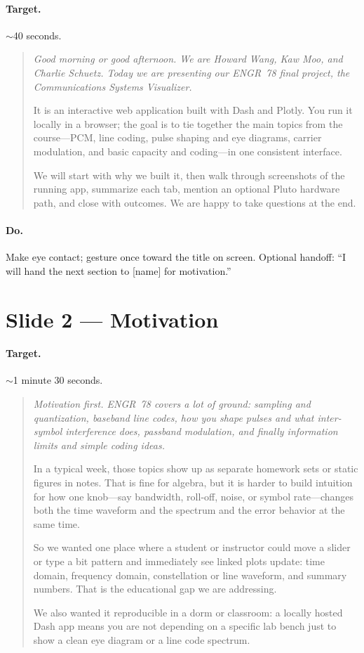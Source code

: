 \documentclass[11pt,a4paper]{article}
\newcommand{\speak}[1]{%
  \begin{quote}\itshape #1\end{quote}%
}
\newcommand{\doitem}[1]{\paragraph{Do.} #1\par\vspace{0.6em}}
\begin{document}
\paragraph{Target.} $\sim$40 seconds.

\speak{%
Good morning or good afternoon. We are Howard Wang, Kaw Moo, and Charlie Schuetz. Today we are presenting our ENGR~78 final project, the Communications Systems Visualizer.

It is an interactive web application built with Dash and Plotly. You run it locally in a browser; the goal is to tie together the main topics from the course---PCM, line coding, pulse shaping and eye diagrams, carrier modulation, and basic capacity and coding---in one consistent interface.

We will start with why we built it, then walk through screenshots of the running app, summarize each tab, mention an optional Pluto hardware path, and close with outcomes. We are happy to take questions at the end.%
}

\doitem{Make eye contact; gesture once toward the title on screen. Optional handoff: ``I will hand the next section to [name] for motivation.''}

\section{Slide 2 --- Motivation}

\paragraph{Target.} $\sim$1 minute 30 seconds.

\speak{%
Motivation first. ENGR~78 covers a lot of ground: sampling and quantization, baseband line codes, how you shape pulses and what inter-symbol interference does, passband modulation, and finally information limits and simple coding ideas.

In a typical week, those topics show up as separate homework sets or static figures in notes. That is fine for algebra, but it is harder to build intuition for how one knob---say bandwidth, roll-off, noise, or symbol rate---changes both the time waveform and the spectrum and the error behavior at the same time.

So we wanted one place where a student or instructor could move a slider or type a bit pattern and immediately see linked plots update: time domain, frequency domain, constellation or line waveform, and summary numbers. That is the educational gap we are addressing.

We also wanted it reproducible in a dorm or classroom: a locally hosted Dash app means you are not depending on a specific lab bench just to show a clean eye diagram or a line code spectrum.%
}
\end{document}
